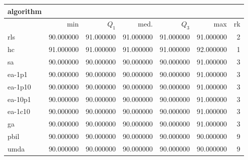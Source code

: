 \begin{tabular}{@{}l*{5}{>{{}}N{3}{0}}>{{}}N{2}{0}@{}}
\toprule
{algorithm} &  \\
\midrule
& {min} & {$Q_1$} & {med.} & {$Q_3$} & {max} & {rk}\\
\midrule
rls & 90.000000 & {\color{blue}} 91.000000 & {\color{blue}} 91.000000 & {\color{blue}} 91.000000 & 91.000000 & 2\\
hc & {\color{blue}} 91.000000 & {\color{blue}} 91.000000 & {\color{blue}} 91.000000 & {\color{blue}} 91.000000 & {\color{blue}} 92.000000 & 1\\
sa & 90.000000 & 90.000000 & 90.000000 & 90.000000 & 91.000000 & 3\\
ea-1p1 & 90.000000 & 90.000000 & 90.000000 & 90.000000 & 91.000000 & 3\\
ea-1p10 & 90.000000 & 90.000000 & 90.000000 & 90.000000 & 91.000000 & 3\\
ea-10p1 & 90.000000 & 90.000000 & 90.000000 & 90.000000 & 91.000000 & 3\\
ea-1c10 & 90.000000 & 90.000000 & 90.000000 & 90.000000 & 91.000000 & 3\\
ga & 90.000000 & 90.000000 & 90.000000 & 90.000000 & 91.000000 & 3\\
pbil & 90.000000 & 90.000000 & 90.000000 & 90.000000 & 90.000000 & 9\\
umda & 90.000000 & 90.000000 & 90.000000 & 90.000000 & 90.000000 & 9\\
\bottomrule
\end{tabular}
